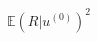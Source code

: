 \documentclass[preview]{standalone}
\begin{document}
\begin{align*}
\mathbb{E}(R| u^{(0)})^{2}
\end{align*}
\end{document}
